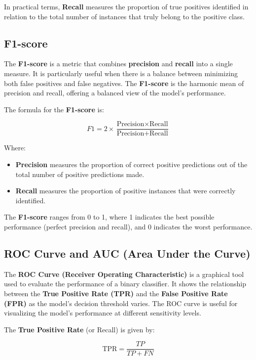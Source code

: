 \documentclass[conference]{IEEEtran}
\begin{document}
	In practical terms, \textbf{Recall} measures the proportion of true positives identified in relation to the total number of instances that truly belong to the positive class.
	
	\subsection{F1-score}
	
	The \textbf{F1-score} is a metric that combines \textbf{precision} and \textbf{recall} into a single measure. It is particularly useful when there is a balance between minimizing both false positives and false negatives. The \textbf{F1-score} is the harmonic mean of precision and recall, offering a balanced view of the model's performance.
	
	The formula for the \textbf{F1-score} is:
	
	\[
	F1 = 2 \times \frac{\text{Precision} \times \text{Recall}}{\text{Precision} + \text{Recall}}
	\]
	
	Where:
	
	\begin{itemize}
		\item \textbf{Precision} measures the proportion of correct positive predictions out of the total number of positive predictions made.
		\item \textbf{Recall} measures the proportion of positive instances that were correctly identified.
	\end{itemize}
	
	The \textbf{F1-score} ranges from 0 to 1, where 1 indicates the best possible performance (perfect precision and recall), and 0 indicates the worst performance.
	
	\subsection{ROC Curve and AUC (Area Under the Curve)}
	
	The \textbf{ROC Curve (Receiver Operating Characteristic)} is a graphical tool used to evaluate the performance of a binary classifier. It shows the relationship between the \textbf{True Positive Rate (TPR)} and the \textbf{False Positive Rate (FPR)} as the model's decision threshold varies. The ROC curve is useful for visualizing the model's performance at different sensitivity levels.
	
	The \textbf{True Positive Rate} (or Recall) is given by:
	
	\[
	\text{TPR} = \frac{TP}{TP + FN}
	\]
	
\end{document}
